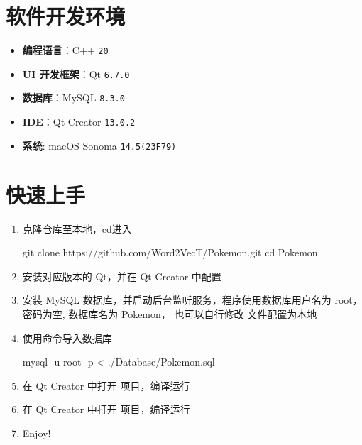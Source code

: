 \section{软件开发环境}

\begin{itemize}
    \item \textbf{编程语言}：C++ \verb|20|
    \item \textbf{UI 开发框架}：Qt \verb|6.7.0|
    \item \textbf{数据库}：MySQL \verb|8.3.0|
    \item \textbf{IDE}：Qt Creator \verb|13.0.2|
    \item \textbf{系统}: macOS Sonoma \verb|14.5(23F79)|
\end{itemize}

\section{快速上手}

\begin{enumerate}
    \item 克隆仓库至本地，cd进入 \begin{cppcode}
              git clone https://github.com/Word2VecT/Pokemon.git
              cd Pokemon
          \end{cppcode}
    \item 安装对应版本的 Qt，并在 Qt Creator 中配置
    \item 安装 MySQL 数据库，并启动后台监听服务，程序使用数据库用户名为 root，密码为空, 数据库名为 Pokemon， 也可以自行修改  文件配置为本地
    \item 使用命令导入数据库 \begin{cppcode}
              mysql -u root -p < ./Database/Pokemon.sql
          \end{cppcode}
    \item 在 Qt Creator 中打开  项目，编译运行
    \item 在 Qt Creator 中打开  项目，编译运行
    \item Enjoy!
\end{enumerate}

